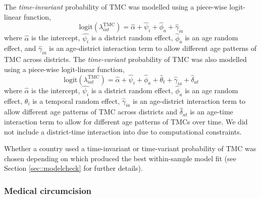 \documentclass{article}
\begin{document}
\begin{appendix}
The {\it time-invariant} probability of TMC was modelled using a piece-wise logit-linear function, 
\begin{equation*} 
	\text{logit}(\lambda^{\text{TMC}}_{iat}) = \hat{\alpha} + \hat{\psi}_i + \hat{\phi}_a + \hat{\gamma}_{ia}
\end{equation*}
where $\hat{\alpha}$ is the intercept, $\hat{\psi_i}$ is a district random effect, $\hat{\phi}_a$ is an age random effect, and $\hat{\gamma}_{ia}$ is an age-district interaction term to allow different age patterns of TMC across districts. The {\it time-variant} probability of TMC was also modelled using a piece-wise logit-linear function, 
\begin{equation*} 
	\text{logit}(\lambda^{\text{TMC}}_{iat}) = \hat{\alpha} + \hat{\psi}_i + \hat{\phi}_a + \hat{\theta}_t + \hat{\gamma}_{ia} + \hat{\delta}_{at}
\end{equation*}
where $\hat{\alpha}$ is the intercept, $\hat{\psi_i}$ is a district random effect, $\hat{\phi}_a$ is an age random effect, $\theta_i$ is a temporal random effect,  $\hat{\gamma}_{ia}$ is an age-district interaction term to allow different age patterns of TMC across districts and $\hat{\delta}_{at}$ is an age-time interaction term to allow for different age patterns of TMCs over time. We did not include a district-time interaction into due to computational constraints. 

Whether a country used a time-invariant or time-variant probability of TMC was chosen depending on which produced the best within-sample model fit (see Section \ref{sec::modelcheck} for further details). 


\subsubsection*{Medical circumcision}



\end{appendix}
\end{document}
